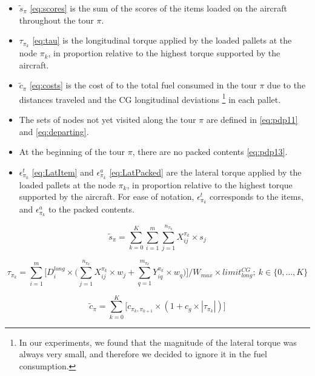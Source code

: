 \documentclass[preprint]{elsarticle}
\begin{document}
\begin{itemize}
	\item $\tilde{s}_\pi$\/ \ref{eq:scores} is the sum of the scores of the items loaded on the aircraft throughout the tour $\pi$.
	\item $\tau_{\pi_k}$\/ \ref{eq:tau} is the longitudinal torque applied by the loaded pallets at the node ${\pi_k}$, in proportion relative to the highest torque supported by the aircraft.
	\item $\tilde{c}_\pi$\/ \ref{eq:costs} is the cost of to the total fuel consumed in the tour $\pi$\/ due to the distances traveled and the CG longitudinal deviations \footnote{In our experiments, we found that the magnitude of the lateral torque was always very small, and therefore we decided to ignore it in the fuel consumption.} in each pallet.
	\item The sets of nodes not yet visited along the tour $\pi$\/ are defined in \ref{eq:pdp11} and \ref{eq:departing}.
	\item At the beginning of the tour $\pi$, there are no packed contents \ref{eq:pdp13}. 
	\item $\epsilon_{\pi_k}^t$\/ \ref{eq:LatItem} and $\epsilon_{\pi_k}^a$\/ \ref{eq:LatPacked} are the lateral torque applied by the loaded pallets at the node ${\pi_k}$, in proportion relative to the highest torque supported by the aircraft. For ease of notation, $\epsilon_{\pi_k}^t$\/ corresponds to the items, and $\epsilon_{\pi_k}^a$\/ to the packed contents.
\end{itemize}

\begin{equation} \label{eq:scores}
	\tilde{s}_\pi = \sum_{k=0}^{K} \sum_{i=1}^{m} \sum_{j=1}^{n_{\pi_k}} X_{ij}^{\pi_k} \times s_j
\end{equation}


\begin{equation} \label{eq:tau}
	\tau_{\pi_k} = \sum_{i=1}^{m} \Big [ D_i^{long} \times \Big ( \sum_{j=1}^{n_{\pi_k}} X_{ij}^{\pi_k} \times w_j +  \sum_{q=1}^{m_{\pi_k}} Y_{iq}^{\pi_k} \times w_q \Big ) \Big ] \Big / W_{max} \times limit^{CG}_{long}; \ k \in \{0, \ldots, K\}
\end{equation}


\begin{equation} \label{eq:costs}
	\tilde{c}_{\pi} = \sum_{k=0}^{K} \Big [ c_{\pi_k, \pi_{k+1}}\times(1+c_g\times|\tau_{\pi_k}|) \Big ] 
\end{equation}
\end{document}
